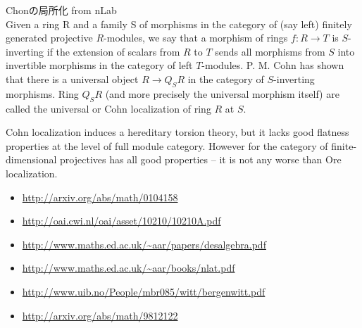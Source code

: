 	\begin{note}[環の局所化]\label{note:環の局所化} %
		Chonの局所化 from nLab \\
		Given a ring R and a family S of morphisms in the category of 
		(say left) finitely generated projective $R$-modules, we say that 
		a morphism of rings $f:R\to T$ is $S$-inverting if the extension of 
		scalars from $R$ to $T$ sends all morphisms from $S$ into invertible
		morphisms in the category of left $T$-modules. P. M. Cohn has shown
		that there is a universal object $R\to Q_SR$ in the category of 
		$S$-inverting morphisms. Ring $Q_SR$ (and more precisely the universal 
		morphism itself) are called the universal or Cohn localization of 
		ring $R$ at $S$. 

		Cohn localization induces a hereditary torsion theory, but it lacks
		good flatness properties at the level of full module category. 
		However for the category of finite-dimensional projectives has all 
		good properties – it is not any worse than Ore localization.

		\begin{itemize}\setlength{\itemsep}{-1mm} %
			\item \url{http://arxiv.org/abs/math/0104158}
			\item \url{http://oai.cwi.nl/oai/asset/10210/10210A.pdf}
			\item \url{http://www.maths.ed.ac.uk/~aar/papers/desalgebra.pdf}
			\item \url{http://www.maths.ed.ac.uk/~aar/books/nlat.pdf}
			\item \url{http://www.uib.no/People/mbr085/witt/bergenwitt.pdf}
			\item \url{http://arxiv.org/abs/math/9812122}
		\end{itemize} %
	\end{note} %

